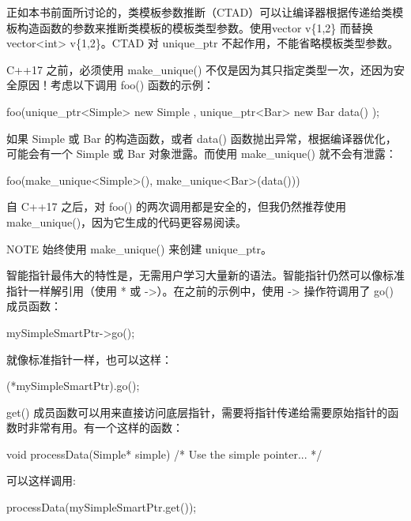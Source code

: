 正如本书前面所讨论的，类模板参数推断（CTAD）可以让编译器根据传递给类模板构造函数的参数来推断类模板的模板类型参数。使用vector v\{1,2\} 而替换 vector<int> v\{1,2\}。CTAD 对 unique\_ptr 不起作用，不能省略模板类型参数。

C++17 之前，必须使用 make\_unique() 不仅是因为其只指定类型一次，还因为安全原因！考虑以下调用 foo() 函数的示例：

\begin{cpp}
foo(unique_ptr<Simple> { new Simple{} }, unique_ptr<Bar> { new Bar { data() } });
\end{cpp}

如果 Simple 或 Bar 的构造函数，或者 data() 函数抛出异常，根据编译器优化，可能会有一个 Simple 或 Bar 对象泄露。而使用 make\_unique() 就不会有泄露：

\begin{cpp}
foo(make_unique<Simple>(), make_unique<Bar>(data()))
\end{cpp}

自 C++17 之后，对 foo() 的两次调用都是安全的，但我仍然推荐使用 make\_unique()，因为它生成的代码更容易阅读。

\begin{myNotic}{NOTE}
始终使用 make\_unique() 来创建 unique\_ptr。
\end{myNotic}


智能指针最伟大的特性是，无需用户学习大量新的语法。智能指针仍然可以像标准指针一样解引用（使用 * 或 ->）。在之前的示例中，使用 -> 操作符调用了 go() 成员函数：

\begin{cpp}
mySimpleSmartPtr->go();
\end{cpp}

就像标准指针一样，也可以这样：

\begin{cpp}
(*mySimpleSmartPtr).go();
\end{cpp}

get() 成员函数可以用来直接访问底层指针，需要将指针传递给需要原始指针的函数时非常有用。有一个这样的函数：

\begin{cpp}
void processData(Simple* simple) { /* Use the simple pointer... */ }
\end{cpp}

可以这样调用:

\begin{cpp}
processData(mySimpleSmartPtr.get());
\end{cpp}

